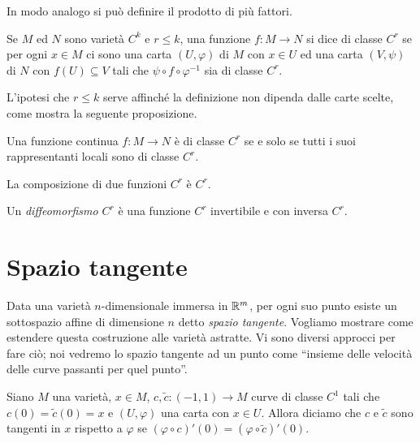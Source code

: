 In modo analogo si può definire il prodotto di più fattori.
 
 \begin{definition} 
  Se $M$ ed $N$ sono varietà $C^k$ e $r\le k$, una funzione $f:M\to N$ si dice
  di classe $C^r$ se per ogni $x\in M$ ci sono una carta $(U,\varphi)$ di $M$ con
  $x\in U$ ed una carta $(V,\psi)$ di $N$ con $f(U)\subseteq V$ tali che $\psi\circ f\circ\varphi^{-1}$
  sia di classe $C^r$.
 \end{definition}
 
 L'ipotesi che $r\le k$ serve affinché la definizione non dipenda dalle carte scelte, come
 mostra la seguente proposizione.
 
 \begin{proposition}
  Una funzione continua $f:M\to N$ è di classe $C^r$ se e solo se tutti i suoi rappresentanti locali sono di classe $C^r$.
 \end{proposition}
 
 \begin{proposition}
   La composizione di due funzioni $C^r$ è $C^r$.
 \end{proposition}
 
 \begin{definition} 
  Un \emph{diffeomorfismo $C^r$} è una funzione $C^r$ invertibile e con inversa $C^r$.
 \end{definition}
 
 \section{Spazio tangente}
 
 Data una varietà $n$-dimensionale immersa in $\mathbb R^m$, per ogni suo punto esiste
 un sottospazio affine di dimensione $n$ detto \emph{spazio tangente}. Vogliamo
 mostrare come estendere questa costruzione alle varietà astratte. Vi sono diversi
 approcci per fare ciò; noi vedremo lo spazio tangente ad un punto come ``insieme delle
 velocità delle curve passanti per quel punto''.
 
\begin{definition}
	Siano $M$ una varietà, $x\in M$, $c,\tilde{c}:(-1,1)\to M$ curve di classe $C^1$ tali che $c(0)=\tilde{c}(0)=x$ e $(U,\varphi)$ una carta con $x\in U$. Allora diciamo che $c$ e $\tilde{c}$ sono 	tangenti in $x$ rispetto a $\varphi$ se $(\varphi\circ c)'(0)=(\varphi\circ\tilde{c})'(0)$.
\end{definition}

